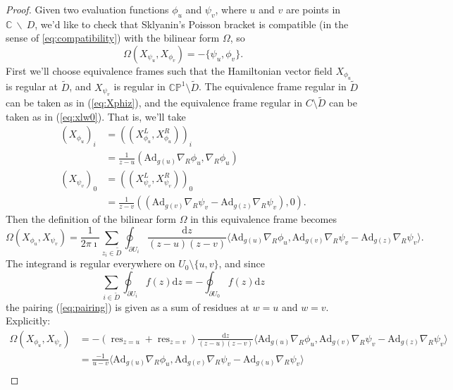 \documentclass[11pt, oneside, reqno]{amsart}
\theoremstyle{definition} \newtheorem{definition}{Definition}[section]
\theoremstyle{definition} \newtheorem{remark}[definition]{Remark}
\theoremstyle{definition} \newtheorem{remarks}[definition]{Remarks}
\theoremstyle{definition} \newtheorem{question}[definition]{Question}
\theoremstyle{definition} \newtheorem*{note}{Note}
\theoremstyle{definition} \newtheorem{example}[definition]{Example}
\theoremstyle{definition} \newtheorem{examples}[definition]{Examples}
\newcommand{\bb}[1]{\mathbb{#1}}
\newcommand{\mr}[1]{\mathrm{#1}}
\newcommand{\bs}{\ \backslash \ }
\newcommand{\CC}{\mathbb{C}}
\DeclareMathOperator{\res}{res}
\renewcommand{\d}{\mathrm{d}}
\newcommand{\Ad}{\mr{Ad}}
\begin{document}
\begin{proof}
  Given two evaluation functions $\phi_{u}$ and $\psi_{v}$, where $u$ and $v$ are points in $\CC \bs D$, we'd like to check
  that Sklyanin's Poisson bracket is compatible (in the sense of \ref{eq:compatibility}) with the bilinear form $\Omega$, so
\begin{equation}
  \Omega(X_{\psi_{u}}, X_{\phi_{v}})  = - \{\psi_{u}, \phi_{v}\}.
\end{equation}
First we'll choose equivalence frames such that the Hamiltonian vector field $X_{\phi_{u}}$ is regular at $\tilde D$, and $X_{\psi_{v}}$ is regular in $\bb{CP}^1 \setminus \tilde D$.  The equivalence frame regular in $\tilde D$ can be taken as in  (\ref{eq:Xphiz}),
and the equivalence frame regular in $C \setminus \tilde D$ can be taken
as in (\ref{eq:xlw0}). That is, we'll take
\begin{align*}
    (X_{\phi_{u}})_{i} &= ((X_{\phi_{u}}^{L}, X_{\phi_{u}}^{R}))_{i} \\
    &=  \frac{1}{z - u} \left(\Ad_{g(u)} \nabla_R \phi_{u},   \nabla_{R} \phi_{u}\right) \\
    (X_{\psi_{v}})_{0} &= ((X_{\psi_{v}}^{L}, X_{\psi_{v}}^{R}))_{0} \\
    &= \frac{1}{z - v} \left(\left( \Ad_{g(v)} \nabla_R \psi_{v} - \Ad_{g(z)} \nabla_{R} \psi_{v}\right), 0\right).
\end{align*}
Then the definition of the bilinear form $\Omega$ in this equivalence frame becomes
\begin{equation}
  \label{eq:pairing}
  \Omega(X_{\phi_{u}}, X_{\psi_{v}}) = \frac{1}{2 \pi \imath }
  \sum_{z_i \in \tilde D} \oint_{\partial U_i} \frac{\d z}{(z - u)(z - v)} \langle \Ad_{g(u)} \nabla_{R} \phi_{u},
  \Ad_{g(v)} \nabla_{R} \psi_{v}  - \Ad_{g(z)} \nabla_{R} \psi_{v} \rangle.
\end{equation}
The integrand is regular everywhere on $U_0 \setminus \{u, v\}$, and since
\[\sum_{i \in \tilde D} \oint_{\partial U_i } f(z) \d z  = - \oint_{\partial U_0} f(z) \d z\]
the pairing (\ref{eq:pairing}) is given as a sum of residues at $w = u$ and $w = v$.  Explicitly:
  \begin{align*}
   \Omega(X_{\phi_{u}}, X_{\psi_{v}}) &= - (\res_{z = u}  + \res_{z = v}) \frac{\d z}{(z - u)(z - v)} \langle \Ad_{g(u)} \nabla_{R} \phi_{u},   \Ad_{g(v)} \nabla_{R} \psi_{v}  - \Ad_{g(z)} \nabla_{R} \psi_{v} \rangle \\
   &=   \frac{-1}{u - v}  \langle \Ad_{g(u)} \nabla_{R} \phi_{u} , \Ad_{g(v)} \nabla_{R} \psi_{v}  - \Ad_{g(u)} \nabla_{R} \psi_{v} \rangle  \\

\end{align*}
\end{proof}
\end{document}
